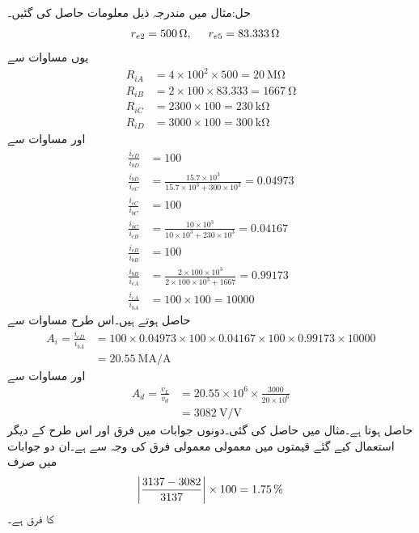 حل:مثال  میں مندرجہ ذیل معلومات حاصل کی گئیں۔
\begin{align*}
r_{e2}&=\SI{500}{\ohm}, \hspace{5mm} r_{e5}=\SI{83.333}{\ohm}
\end{align*}
یوں مساوات  سے
\begin{align*}
R_{iA}&=4 \times 100^2 \times 500=\SI{20}{\mega \ohm}\\
R_{iB}&=2 \times 100 \times 83.333=\SI{1667}{\ohm}\\
R_{iC}& =2300 \times 100=\SI{230}{\kilo \ohm}\\
R_{iD}& =3000 \times 100=\SI{300}{\kilo \ohm}
\end{align*}
اور مساوات  سے 
\begin{align*}
\frac{i_{eD}}{i_{bD}}&=100\\
\frac{i_{bD}}{i_{cC}}&=\frac{15.7 \times 10^3}{15.7 \times 10^3+300 \times 10^3}=0.04973\\
\frac{i_{cC}}{i_{bC}}&=100\\
\frac{i_{bC}}{i_{cB}}&=\frac{10 \times 10^3}{10 \times 10^3+230 \times 10^3}=0.04167\\
\frac{i_{cB}}{i_{bB}}&=100\\
\frac{i_{bB}}{i_{cA}}&=\frac{2 \times 100 \times 10^3}{2 \times 100 \times 10^3+1667}=0.99173\\
\frac{i_{cA}}{i_{bA}}&= 100 \times 100=10000
\end{align*}
حاصل ہوتے ہیں۔اس طرح مساوات  سے 
\begin{align*}
A_i=\frac{i_{eD}}{i_{bA}}&=100 \times 0.04973 \times 100 \times 0.04167 \times 100 \times 0.99173 \times 10000\\
&=\SI{20.55}{\mega \ampere \per \ampere}
\end{align*}
اور مساوات  سے 
\begin{align*}
A_d=\frac{v_L}{v_d} &=20.55 \times 10^6 \times \frac{3000}{20 \times 10^6}\\
&=\SI{3082}{\volt \per \volt}
\end{align*}
حاصل ہوتا ہے۔مثال  میں  حاصل کی گئی۔دونوں جوابات میں فرق  اور اس طرح کے دیگر استعمال کیے گئے قیمتوں میں معمولی معمولی فرق کی وجہ سے ہے۔ان دو جوابات میں صرف
\begin{align*}
\abs{\frac{3137-3082}{3137}} \times 100=\SI{1.75}{\percent}
\end{align*}
کا فرق ہے۔


